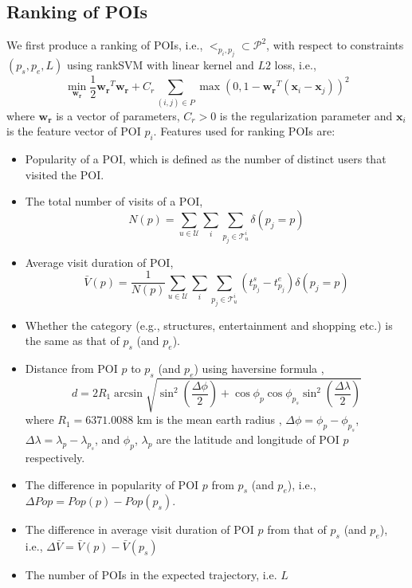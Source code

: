 \subsection{Ranking of POIs}
\label{method:ranking}
We first produce a ranking of POIs, i.e., $<_{p_i, p_j} \subset \mathcal{P}^2$,
with respect to constraints $(p_s, p_e, L)$ 
using rankSVM with linear kernel and $L2$ loss\cite{lranksvm}, 
i.e.,
\begin{displaymath}
\min_{\mathbf{w_r}} \frac{1}{2} \mathbf{w_r}^T \mathbf{w_r} +
                  C_r \sum_{(i, j) \in P} \max \left( 0, 1 - \mathbf{w_r}^T (\mathbf{x}_i - \mathbf{x}_j) \right)^2
\end{displaymath}
where $\mathbf{w_r}$ is a vector of parameters, 
$C_r > 0$ is the regularization parameter and 
$\mathbf{x}_i$ is the feature vector of POI $p_i$.
Features used for ranking POIs are:
\begin{itemize}
\item Popularity of a POI, which is defined as the number of distinct users that visited the POI\cite{ht10}.
\item The total number of visits of a POI,
      \begin{displaymath}
          N(p) = \sum_{u \in \mathcal{U}} \sum_i \sum_{p_j \in \mathcal{T}_u^i} \delta(p_j = p)
      \end{displaymath}
\item Average visit duration of POI\cite{ijcai15},
      \begin{displaymath}
          \bar{V}(p) = \frac{1}{N(p)} \sum_{u \in \mathcal{U}} \sum_i \sum_{p_j \in \mathcal{T}_u^i} (t_{p_j}^s - t_{p_j}^e) \delta(p_j = p)
      \end{displaymath}
\item Whether the category (e.g., structures, entertainment and shopping etc.) is the same as that of $p_s$ (and $p_e$).
\item Distance from POI $p$ to $p_s$ (and $p_e$) using haversine formula \cite{haversine},
      \begin{displaymath}
      d = 2 R_1 \arcsin \sqrt{ \sin^2 \left( \frac{\Delta \phi}{2} \right) + 
           \cos \phi_p \cos \phi_{p_s} \sin^2 \left( \frac{\Delta \lambda}{2} \right) }
      \end{displaymath}
            where $R_1 = 6371.0088$ km is the mean earth radius \cite{earth_radius}, 
            $\Delta \phi = \phi_p - \phi_{p_s}$, $\Delta \lambda = \lambda_p - \lambda_{p_s}$,
            and $\phi_p$, $\lambda_p$ are the latitude and longitude of POI $p$ respectively.
\item The difference in popularity of POI $p$ from $p_s$ (and $p_e$),
      i.e., $\Delta Pop = Pop(p) - Pop(p_s)$.
\item The difference in average visit duration of POI $p$ from that of $p_s$ (and $p_e$),
      i.e., $\Delta \bar{V} = \bar{V}(p) - \bar{V}(p_s)$
\item The number of POIs in the expected trajectory, i.e. $L$
\end{itemize}

